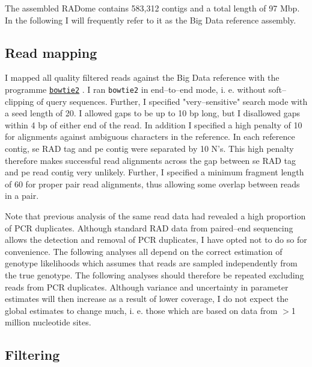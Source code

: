 \documentclass[a4paper,12pt,times,authoryear,twoside,print,index]{Classes/PhDThesisPSnPDF}\usepackage[]{graphicx}\usepackage[]{color}
\begin{document}
The assembled RADome contains 583,312 contigs and a total length of 97 \gls{Mbp}. In the following I will frequently refer to it as the Big Data reference assembly. 
%
%
\subsection{Read mapping}
%
%
I mapped all quality filtered reads against the Big Data reference with the programme \href{http://bowtie-bio.sourceforge.net/bowtie2/manual.shtml}{\texttt{bowtie2}} \citep{Langmead2012}. I ran \texttt{bowtie2} in end--to--end mode, i. e. without soft--clipping of query sequences. Further, I specified "very--sensitive" search mode with a seed length of 20. I allowed gaps to be up to 10 bp long, but I disallowed gaps within 4 bp of either end of the read. In addition I specified a high penalty of 10 for alignments against ambiguous characters in the reference. In each reference contig, \gls{se} RAD tag and \gls{pe} contig were separated by 10 N's. This high penalty therefore makes successful read alignments across the gap between \gls{se} RAD tag and \gls{pe} read contig very unlikely. Further, I specified a minimum fragment length of 60 for \gls{proper pair} read alignments, thus allowing some overlap between reads in a pair. 

Note that previous analysis of the same read data had revealed a high proportion of PCR duplicates. Although standard RAD data from paired--end sequencing allows the detection and removal of PCR duplicates, I have opted not to do so for convenience. The following analyses all depend on the correct estimation of genotype likelihoods which assumes that reads are sampled independently from the true genotype. The following analyses should therefore be repeated excluding reads from PCR duplicates. Although variance and uncertainty in parameter estimates will then increase as a result of lower coverage, I do not expect the global estimates to change much, i. e. those which are based on data from $>$1 million nucleotide sites.

%
%
\subsection{Filtering}
%
%
\end{document}
